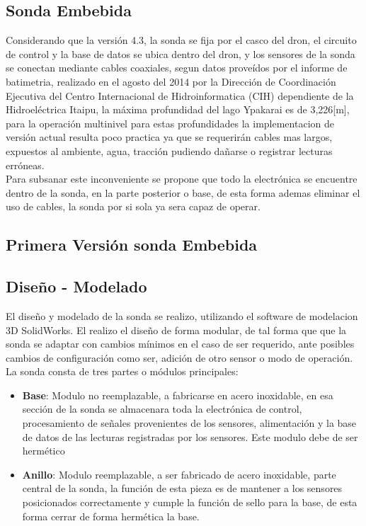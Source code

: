 \begin{appendices}
\subsection*{Sonda Embebida}
Considerando que la versión 4.3, la sonda se fija por el casco del dron, el circuito de control y la base de datos se ubica dentro del dron, y los sensores de la sonda se conectan mediante cables coaxiales, segun datos proveídos por el informe de batimetria, realizado en el agosto del 2014  por la Dirección de Coordinación Ejecutiva del Centro Internacional de Hidroinformatica (CIH) dependiente de la Hidroeléctrica Itaipu, la máxima profundidad del lago Ypakarai es de 3,226[m], para la operación multinivel para estas profundidades la implementacion de versión actual resulta poco practica ya que se requerirán cables mas largos, expuestos al ambiente, agua, tracción pudiendo dañarse o registrar lecturas erróneas.\\ Para subsanar este inconveniente se propone que todo la electrónica se encuentre dentro de la sonda, en la parte posterior o base, de esta forma ademas eliminar el uso de cables, la sonda por si sola ya sera capaz de operar.

\subsection*{Primera Versi\'on sonda Embebida}

\subsection*{Diseño - Modelado}
El dise\~no y modelado de la sonda se realizo, utilizando el software de modelacion 3D SolidWorks.
El realizo el diseño de forma modular, de tal forma que que la sonda se adaptar con cambios mínimos en el caso de ser requerido, ante posibles cambios de configuración como ser, adición de otro sensor o modo de operación.    
La sonda consta de tres partes o módulos principales:

\begin{itemize}
\item \textbf{Base}: Modulo no reemplazable, a fabricarse en acero inoxidable, en esa sección de la sonda se almacenara toda la electrónica de control, procesamiento de señales provenientes de los sensores, alimentación y la base de datos de las lecturas registradas por los sensores. Este modulo debe de ser hermético 

\item \textbf{Anillo}: Modulo reemplazable, a ser fabricado de acero inoxidable, parte central de la sonda, la función de esta pieza es de mantener a los sensores posicionados correctamente y cumple la función de sello para la base, de esta forma cerrar de forma hermética la base.


\end{itemize}
\end{appendices}
